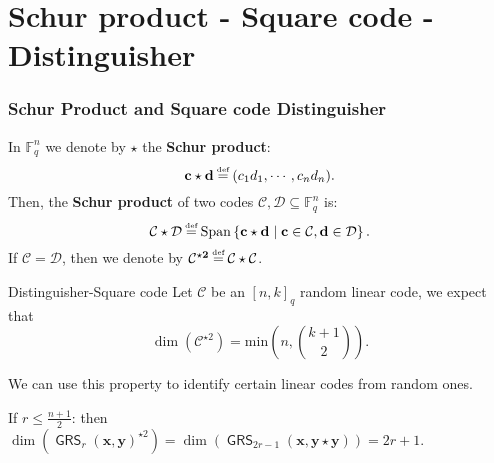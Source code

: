 \documentclass[
10pt, %
%
aspectratio=169, %
]{beamer}
\theoremstyle{plain}%
\theoremstyle{definition}
\theoremstyle{remark}
\newcommand{\calC}{\mathcal{C}}
\newcommand{\calD}{\mathcal{D}}
\newcommand{\fqm}{\mathbb{F}_{q^m}}
\newcommand{\fq}{\mathbb{F}_{q}}
\newcommand{\Span}[1]{\operatorname{Span}\left\lbrace #1\right\rbrace }
\newcommand{\GRS}{\operatorname{\mathsf{GRS}}}
\newcommand\myeq{\mathrel{\stackrel{\makebox[0pt]{\mbox{\normalfont\tiny def}}}{=}}}
\begin{document}
\section{Schur product - Square code - Distinguisher}
\begin{frame}
	\frametitle{Schur Product and Square code Distinguisher}
	In $\fq^n$ we denote by $\star$ the \textbf{Schur product}:
	\[ \mathbf{c} \star \mathbf{d} \myeq (c_1d_1,\cdots,c_nd_n). \]
	Then, the \textbf{Schur product} of two codes $\calC, \calD \subseteq \fq^n$ is:
	\[ \mathbf{\calC } \star \mathbf{\calD }\myeq \Span{\mathbf{c} \star \mathbf{d} \mid \mathbf{c} \in \calC, \mathbf{d} \in \calD}. \]
	If $\calC = \calD$, then we denote by $\mathbf{\calC^{\star2} \myeq \calC \star \calC} $.
	\begin{alertblock}{Distinguisher-Square code}
		Let $\calC$ be an $[n, k]_q$ random linear code, we expect that
		\[\displaystyle \dim (\calC^{\star2}) = \mathrm{min}\left(n,\binom{k+1}{2}\right).\]
	\end{alertblock}
	We can use this property to identify certain linear codes from random ones.
	\begin{tcolorbox}[colback=aliceblue]
		 If $r \leq \frac{n+1}{2}$: then
		$\dim(\GRS_r(\mathbf{x},\mathbf{y})^{\star 2})=\dim(\GRS_{2r-1}(\mathbf{x},\mathbf{y\star y}))= 2r+1.$
	\end{tcolorbox}
\end{frame}
\end{document}
